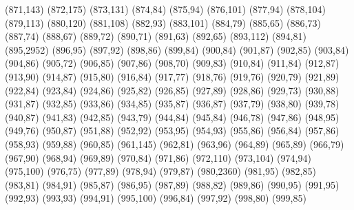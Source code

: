 (871,143)
(872,175)
(873,131)
(874,84)
(875,94)
(876,101)
(877,94)
(878,104)
(879,113)
(880,120)
(881,108)
(882,93)
(883,101)
(884,79)
(885,65)
(886,73)
(887,74)
(888,67)
(889,72)
(890,71)
(891,63)
(892,65)
(893,112)
(894,81)
(895,2952)
(896,95)
(897,92)
(898,86)
(899,84)
(900,84)
(901,87)
(902,85)
(903,84)
(904,86)
(905,72)
(906,85)
(907,86)
(908,70)
(909,83)
(910,84)
(911,84)
(912,87)
(913,90)
(914,87)
(915,80)
(916,84)
(917,77)
(918,76)
(919,76)
(920,79)
(921,89)
(922,84)
(923,84)
(924,86)
(925,82)
(926,85)
(927,89)
(928,86)
(929,73)
(930,88)
(931,87)
(932,85)
(933,86)
(934,85)
(935,87)
(936,87)
(937,79)
(938,80)
(939,78)
(940,87)
(941,83)
(942,85)
(943,79)
(944,84)
(945,84)
(946,78)
(947,86)
(948,95)
(949,76)
(950,87)
(951,88)
(952,92)
(953,95)
(954,93)
(955,86)
(956,84)
(957,86)
(958,93)
(959,88)
(960,85)
(961,145)
(962,81)
(963,96)
(964,89)
(965,89)
(966,79)
(967,90)
(968,94)
(969,89)
(970,84)
(971,86)
(972,110)
(973,104)
(974,94)
(975,100)
(976,75)
(977,89)
(978,94)
(979,87)
(980,2360)
(981,95)
(982,85)
(983,81)
(984,91)
(985,87)
(986,95)
(987,89)
(988,82)
(989,86)
(990,95)
(991,95)
(992,93)
(993,93)
(994,91)
(995,100)
(996,84)
(997,92)
(998,80)
(999,85)
